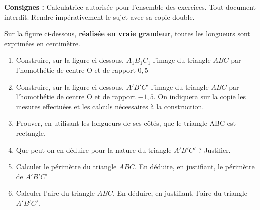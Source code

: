 

\vspace*{5mm}
\textbf{{\large Consignes :}} Calculatrice autorisée pour l'ensemble des exercices. Tout document interdit. Rendre impérativement le sujet avec sa copie double.



\exo
Sur la figure ci-dessous, \textbf{réalisée en vraie grandeur}, toutes les longueurs sont exprimées en centimètre.

\begin{enumerate}

\item Construire, sur la figure ci-dessous, $A_1 B_1 C_1$ l'image du triangle $ABC$ par l'homothétie de centre O et de rapport $0,5$

\item Construire, sur la figure ci-dessous, $A'B'C'$ l'image du triangle $ABC$ par l'homothétie de centre O et de rapport $-1,5$. On indiquera sur la copie les mesures effectuées et les calculs nécessaires à la construction.

\item Prouver, en utilisant les longueurs de ses côtés, que le triangle ABC est rectangle.

\item Que peut-on en déduire pour la nature du triangle $A'B'C'$ ? Justifier.

\item Calculer le périmètre du triangle $ABC$. En déduire, en justifiant, le périmètre de $A'B'C'$

\item Calculer l'aire du triangle $ABC$. En déduire, en justifiant, l'aire du triangle $A'B'C'$.

\end{enumerate}


